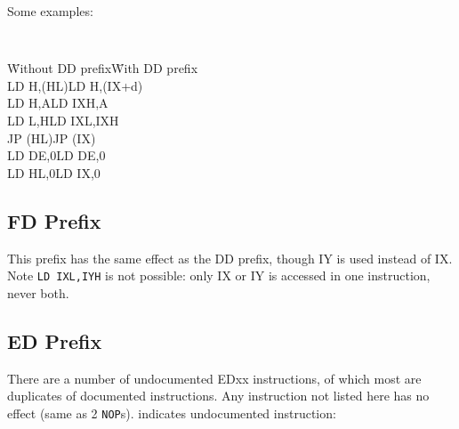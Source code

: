 \documentclass[12pt,twoside,openright,a4paper]{book}
\begin{document}
\pagebreak
Some examples:

{\tt 
	\begin{tabbing}
		{\qquad}\={\rm Without DD prefix}\qquad\={\rm With DD prefix}\+ \\
		LD H,(HL)\>LD H,(IX+d)\\
		LD H,A\>LD IXH,A\\
		LD L,H\>LD IXL,IXH\\
		JP (HL)\>JP (IX)\\
		LD DE,0\>LD DE,0\\
		LD HL,0\>LD IX,0\\
	\end{tabbing}
}


\subsection{FD Prefix \cite{gerton}}

This prefix has the same effect as the DD prefix, though IY is used instead of IX.  Note {\tt LD IXL,IYH} is not possible: only IX or IY is accessed in one instruction, never both.


\subsection{ED Prefix \cite{gerton}}

There are a number of undocumented EDxx instructions, of which most are duplicates of documented instructions. Any instruction not listed here has no effect (same as 2 {\tt NOP}s). \See{**} indicates undocumented instruction:
\end{document}
